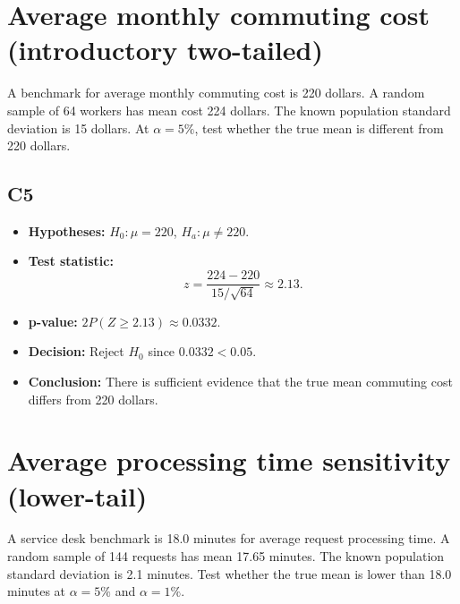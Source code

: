 \begin{center}
\end{center}

\section{Average monthly commuting cost (introductory two-tailed)}
A benchmark for average monthly commuting cost is 220 dollars. A random sample of 64 workers has mean cost 224 dollars. The known population standard deviation is 15 dollars. At \(\alpha=5\%\), test whether the true mean is different from 220 dollars.

\subsection*{C5}
\begin{itemize}
    \item \textbf{Hypotheses:} \(H_0\colon \mu=220\), \(H_a\colon \mu\ne220\).
    \item \textbf{Test statistic:}
    \[
    z=\frac{224-220}{15/\sqrt{64}}\approx 2.13.
    \]
    \item \textbf{p-value:} \(2P(Z\ge 2.13)\approx 0.0332\).
    \item \textbf{Decision:} Reject \(H_0\) since \(0.0332<0.05\).
    \item \textbf{Conclusion:} There is sufficient evidence that the true mean commuting cost differs from 220 dollars.
\end{itemize}

\begin{center}
\end{center}

\section{Average processing time sensitivity (lower-tail)}
A service desk benchmark is 18.0 minutes for average request processing time. A random sample of 144 requests has mean 17.65 minutes. The known population standard deviation is 2.1 minutes. Test whether the true mean is lower than 18.0 minutes at \(\alpha=5\%\) and \(\alpha=1\%\).

